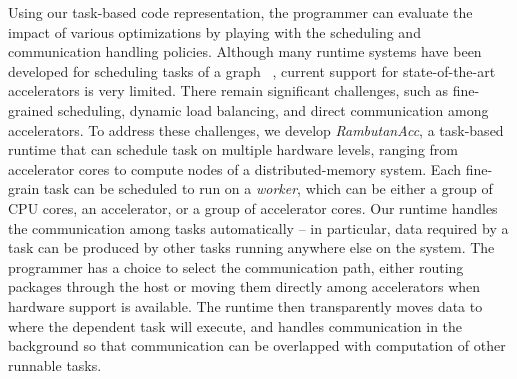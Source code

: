 Using our task-based code representation, the programmer can evaluate the impact of various optimizations by playing with the scheduling and communication handling policies.
Although many runtime systems have been developed for scheduling tasks of a graph ~\cite{legion,physics,mpiacc,mvapich2gpu}, current support for state-of-the-art accelerators is very limited.
There remain significant challenges, such as fine-grained scheduling, dynamic load balancing, and direct communication among accelerators.
To address these challenges, we develop {\em RambutanAcc}, a task-based runtime that can schedule task on multiple hardware levels, ranging from accelerator cores to compute nodes of a distributed-memory system.
Each fine-grain task can be scheduled to run on a {\em worker}, which can be either a group of CPU cores, an accelerator, or a group of accelerator cores.
Our runtime handles the communication among tasks automatically -- in particular, data required by a task can be produced by other tasks running anywhere else on the system.
The programmer has a choice to select the communication path, either routing packages through the host or moving them directly among accelerators when hardware support is available.
The runtime then transparently moves data to where the dependent task will execute, and handles communication in the background so that communication can be overlapped with computation of other runnable tasks.

